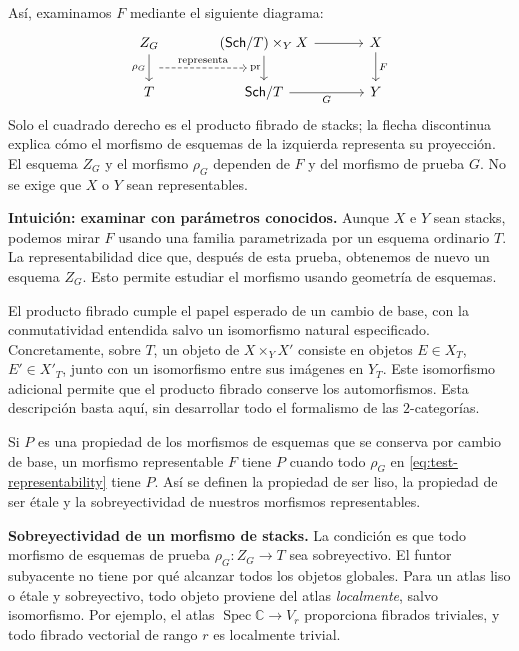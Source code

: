 \documentclass[12pt,openany]{memoir}
\begin{document}
Así, examinamos \(F\) mediante el siguiente diagrama:
\begin{equation}\label{eq:test-representability}
\begin{tikzcd}[column sep=3.5em]
 Z_G \arrow[d,"\rho_G"',""{name=scheme-column,anchor=center}]
 & (\Sch/T)\times_Y X
     \arrow[d,"\pr"',""{name=stack-column,anchor=center}] \arrow[r]
 & X \arrow[d,"F"] \\
 T & \Sch/T \arrow[r,"G"'] & Y
 \arrow[from=scheme-column,to=stack-column,dashed,
   shorten <=.5em,shorten >=1em,
   "\text{representa}"{xshift=-.25em}]
\end{tikzcd}
\end{equation}
Solo el cuadrado derecho es el producto fibrado de stacks; la flecha
discontinua explica cómo el morfismo de esquemas de la izquierda representa
su proyección. El esquema \(Z_G\) y el morfismo \(\rho_G\) dependen de
\(F\) y del morfismo de prueba \(G\). No se exige que \(X\) o \(Y\)
sean representables.

\begin{ptcb}
\textbf{Intuición: examinar con parámetros conocidos.}
Aunque \(X\) e \(Y\) sean stacks, podemos mirar \(F\) usando una
familia parametrizada por un esquema ordinario \(T\). La representabilidad
dice que, después de esta prueba, obtenemos de nuevo un esquema
\(Z_G\). Esto permite estudiar el morfismo usando geometría de esquemas.
\end{ptcb}

El producto fibrado cumple el papel esperado de un cambio de base, con la
conmutatividad entendida salvo un isomorfismo natural especificado.
Concretamente, sobre \(T\), un objeto de \(X\times_Y X'\) consiste en
objetos \(E\in X_T\), \(E'\in X'_T\), junto con un isomorfismo entre
sus imágenes en \(Y_T\). Este isomorfismo adicional permite que el
producto fibrado conserve los automorfismos. Esta descripción basta aquí,
sin desarrollar todo el formalismo de las \(2\)-categorías.

Si \(P\) es una propiedad de los morfismos de esquemas que se conserva
por cambio de base, un morfismo representable \(F\) tiene \(P\) cuando
todo \(\rho_G\) en \eqref{eq:test-representability} tiene \(P\). Así se
definen la propiedad de ser liso, la propiedad de ser étale y la sobreyectividad de
nuestros morfismos representables.

\begin{ptcb}
\textbf{Sobreyectividad de un morfismo de stacks.}
La condición es que todo morfismo de esquemas de prueba
\(\rho_G:Z_G\to T\) sea sobreyectivo. El funtor subyacente no tiene por
qué alcanzar todos los objetos globales.
Para un atlas liso o étale y sobreyectivo, todo objeto proviene del atlas
\emph{localmente}, salvo isomorfismo. Por ejemplo, el atlas
\(\operatorname{Spec}\mathbb C\to V_r\) proporciona fibrados triviales,
y todo fibrado vectorial de rango \(r\) es localmente trivial.
\end{ptcb}
\end{document}
